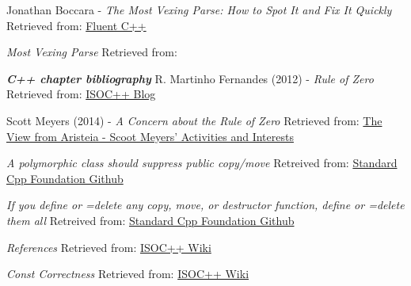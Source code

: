     Jonathan Boccara - \emph{The Most Vexing Parse: How to Spot It and Fix It Quickly}
    \newline
    Retrieved from: \href{https://www.fluentcpp.com/2018/01/30/most-vexing-parse/}{Fluent C++}
    
    \emph{Most Vexing Parse}
    \newline
    Retrieved from: \href{https://en.wikipedia.org/wiki/Most_vexing_parse}{}
    
    \emph{\textbf{C++ chapter bibliography}} 
     R. Martinho Fernandes (2012) - \emph{Rule of Zero}
    \newline
    Retrieved from: \href{https://isocpp.org/blog/2012/11/rule-of-zero}{ISOC++ Blog}

     Scott Meyers (2014) - \emph{A Concern about the Rule of Zero}
    \newline
    Retrieved from: \href{http://scottmeyers.blogspot.fr/2014/03/a-concern-about-rule-of-zero.html}{The View from Aristeia - Scoot Meyers' Activities and Interests}
    
     \emph{A polymorphic class should suppress public copy/move}
    \newline
    Retreived from: \href{https://github.com/isocpp/CppCoreGuidelines/blob/master/CppCoreGuidelines.md#c67-a-polymorphic-class-should-suppress-public-copymove}{Standard Cpp Foundation Github}
    
     \emph{If you define or =delete any copy, move, or destructor function, define or =delete them all}
    \newline
    Retreived from: \href{https://github.com/isocpp/CppCoreGuidelines/blob/master/CppCoreGuidelines.md#c21-if-you-define-or-delete-any-copy-move-or-destructor-function-define-or-delete-them-all}{Standard Cpp Foundation Github}

     \emph{References}
    \newline
    Retrieved from: \href{https://isocpp.org/wiki/faq/references}{ISOC++ Wiki}

     \emph{Const Correctness}
    \newline
    Retrieved from: \href{https://isocpp.org/wiki/faq/const-correctness}{ISOC++ Wiki}

